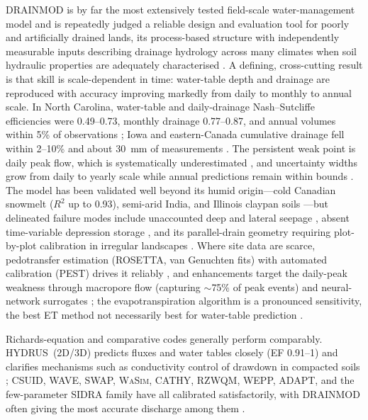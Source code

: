 \documentclass[11pt]{article}
\begin{document}
\textsc{DRAINMOD} is by far the most extensively tested field-scale
water-management model and is repeatedly judged a reliable design and
evaluation tool for poorly and artificially drained lands, its process-based
structure with independently measurable inputs describing drainage hydrology
across many climates when soil hydraulic properties are adequately
characterised \parencite{Singh2019b,Gowda2012}. A defining, cross-cutting
result is that skill is scale-dependent in time: water-table depth and
drainage are reproduced with accuracy improving markedly from daily to monthly
to annual scale. In North Carolina, water-table and daily-drainage
Nash--Sutcliffe efficiencies were 0.49--0.73, monthly drainage 0.77--0.87, and
annual volumes within 5\% of observations \parencite{Gowda2012}; Iowa and
eastern-Canada cumulative drainage fell within 2--10\% and about 30~mm of
measurements \parencite{Singh2006b,Dayyani2009}. The persistent weak point is
daily peak flow, which is systematically underestimated
\parencite{Morrison2014,Singh1996}, and uncertainty widths grow from daily to
yearly scale while annual predictions remain within bounds \parencite{Wang2006}.
The model has been validated well beyond its humid origin---cold Canadian
snowmelt ($R^2$ up to 0.93), semi-arid India, and Illinois claypan soils
\parencite{Dayyani2009,GUPTA1993,MOSTAGHIMI1989,Abduljaleel2023,Awad2022b}---but
delineated failure modes include unaccounted deep and lateral seepage
\parencite{Sinai2006}, absent time-variable depression storage
\parencite{Abduljaleel2023}, and its parallel-drain geometry requiring
plot-by-plot calibration in irregular landscapes \parencite{He2002}. Where
site data are scarce, pedotransfer estimation (ROSETTA, van Genuchten fits)
with automated calibration (PEST) drives it reliably
\parencite{Singh2006b,Qi2015,Malota2024,Malota2015}, and enhancements target
the daily-peak weakness through macropore flow (capturing $\sim$75\% of peak
events) and neural-network surrogates \parencite{Askar2020,Awad2022,Awad2022b};
the evapotranspiration algorithm is a pronounced sensitivity, the best ET
method not necessarily best for water-table prediction
\parencite{Malakshahi2020}.

Richards-equation and comparative codes generally perform comparably.
HYDRUS~(2D/3D) predicts fluxes and water tables closely (EF 0.91--1) and
clarifies mechanisms such as conductivity control of drawdown in compacted
soils \parencite{Karandish2018,DarziNaftchali2018,Mante2018,Guedessou2021,Ebrahimian2015};
CSUID, WAVE, SWAP, \textsc{WaSim}, CATHY, RZWQM, WEPP, ADAPT, and the
few-parameter \textsc{SIDRA} family have all calibrated satisfactorily, with
\textsc{DRAINMOD} often giving the most accurate discharge among them
\parencite{Alzraiee2013b,Alzraiee2013,ElSadek2001,Prasher1996,Verma2014,Malota2022,Muma2017,Malone2014,Xian2017,RevueltaAcosta2021,Mendez2004,Zimmer2023,Henine2022,LESAFFRE1988}.
\end{document}

